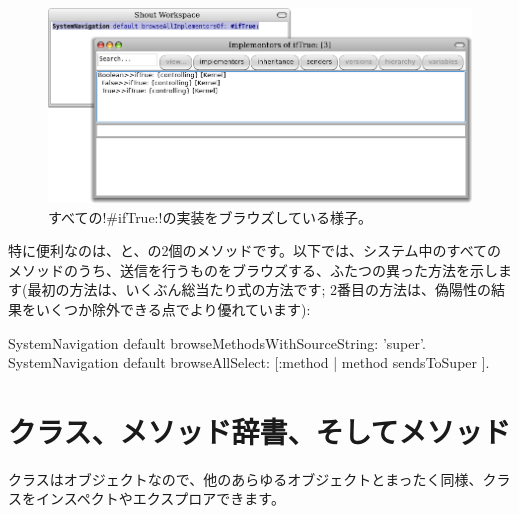 \documentclass[a4paper,10pt,twoside]{book}
\begin{document}
\begin{figure}[ht]\centering
	\includegraphics[width=\linewidth]{implementors}
	\caption{すべての\ct!\#ifTrue:!の実装をブラウズしている様子。}
\end{figure}

特に便利なのは、と、の2個のメソッドです。以下では、システム中のすべてのメソッドのうち、\super{}送信を行うものをブラウズする、ふたつの異った方法を示します(最初の方法は、いくぶん総当たり式の方法です; 2番目の方法は、偽陽性の結果をいくつか除外できる点でより優れています): %
\begin{code}{}
SystemNavigation default browseMethodsWithSourceString: 'super'.
SystemNavigation default browseAllSelect: [:method | method sendsToSuper ].
\end{code}

\section{クラス、メソッド辞書、そしてメソッド}

クラスはオブジェクトなので、他のあらゆるオブジェクトとまったく同様、クラスをインスペクトやエクスプロアできます。
\end{document}
